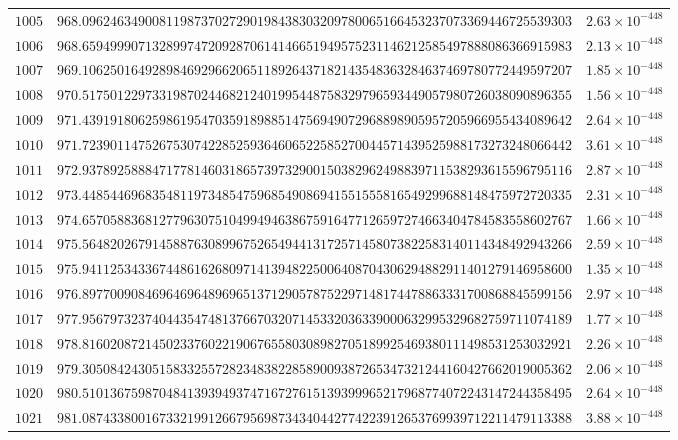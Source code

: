 \documentclass[12pt,reqno]{amsart}
\theoremstyle{remark}
\begin{document}
\begin{longtable}{clc}
$1005$ & $968.0962463490081198737027290198438303209780065166453237073369446725539303$ & $2.63\times 10^{-448}$ \\
$1006$ & $968.6594999071328997472092870614146651949575231146212585497888086366915983$ & $2.13\times 10^{-448}$ \\
$1007$ & $969.1062501649289846929662065118926437182143548363284637469780772449597207$ & $1.85\times 10^{-448}$ \\
$1008$ & $970.5175012297331987024468212401995448758329796593449057980726038090896355$ & $1.56\times 10^{-448}$ \\
$1009$ & $971.4391918062598619547035918988514756949072968898905957205966955434089642$ & $2.64\times 10^{-448}$ \\
$1010$ & $971.7239011475267530742285259364606522585270044571439525988173273248066442$ & $3.61\times 10^{-448}$ \\
$1011$ & $972.9378925888471778146031865739732900150382962498839711538293615596795116$ & $2.87\times 10^{-448}$ \\
$1012$ & $973.4485446968354811973485475968549086941551555816549299688148475972720335$ & $2.31\times 10^{-448}$ \\
$1013$ & $974.6570588368127796307510499494638675916477126597274663404784583558602767$ & $1.66\times 10^{-448}$ \\
$1014$ & $975.5648202679145887630899675265494413172571458073822583140114348492943266$ & $2.59\times 10^{-448}$ \\
$1015$ & $975.9411253433674486162680971413948225006408704306294882911401279146958600$ & $1.35\times 10^{-448}$ \\
$1016$ & $976.8977009084696469648969651371290578752297148174478863331700868845599156$ & $2.97\times 10^{-448}$ \\
$1017$ & $977.9567973237404435474813766703207145332036339000632995329682759711074189$ & $1.77\times 10^{-448}$ \\
$1018$ & $978.8160208721450233760221906765580308982705189925469380111498531253032921$ & $2.26\times 10^{-448}$ \\
$1019$ & $979.3050842430515833255728234838228589009387265347321244160427662019005362$ & $2.06\times 10^{-448}$ \\
$1020$ & $980.5101367598704841393949374716727615139399965217968774072243147244358495$ & $2.64\times 10^{-448}$ \\
$1021$ & $981.0874338001673321991266795698734340442774223912653769939712211479113388$ & $3.88\times 10^{-448}$ \\

\end{longtable}
\end{document}
